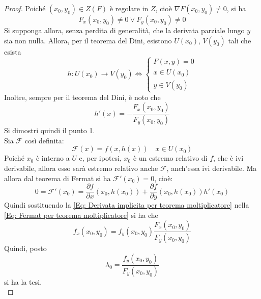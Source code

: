 \begin{proof}
    Poiché $(x_0, y_0) \in Z(F)$ è regolare in $Z$, cioè $\nabla F(x_0, y_0) \neq 0$, si ha 
    \begin{equation*}
        F_x(x_0, y_0) \neq 0 \lor F_y(x_0, y_0) \neq 0
    \end{equation*}
    Si supponga allora, senza perdita di generalità, che la derivata parziale lungo $y$ sia non nulla. Allora, per il teorema del Dini, esistono $U(x_0)$, $V(y_0)$ tali che esista
    \begin{equation*}
    h:U(x_0) \to V(y_0) \iff \begin{cases}
        F(x, y)=0\\
        x\in U(x_0)\\
        y \in V(y_0)
    \end{cases}
    \end{equation*}
    Inoltre, sempre per il teorema del Dini, è noto che
    \begin{equation} \label{Eq: Derivata implicita per teorema moltiplicatore}
        h'(x)=- \frac{F_x(x_0, y_0)}{F_y(x_0, y_0)} 
    \end{equation}
    Si dimostri quindi il punto 1.\\
    Sia $\mathcal{F}$ così definita:
    \begin{equation*}
        \mathcal{F}(x)=f(x, h(x)) \quad x \in U(x_0)
    \end{equation*}
     Poiché $x_0$ è interno a $U$ e, per ipotesi, $x_0$ è un estremo relativo di $f$, che è ivi derivabile, allora esso sarà estremo relativo anche $\mathcal{F}$, anch'essa ivi derivabile. Ma allora dal teorema di Fermat si ha $\mathcal{F}'(x_0)=0$, cioè:
    \begin{equation}  \label{Eq: Fermat per teorema moltiplicatore}    0=\mathcal{F}'(x_0)=\frac{\partial{f}}{\partial{x}}(x_0, h(x_0))+ \frac{\partial{f}}{\partial{y}}(x_0, h(x_0))h'(x_0)
    \end{equation}
    Quindi sostituendo la \eqref{Eq: Derivata implicita per teorema moltiplicatore} nella \eqref{Eq: Fermat per teorema moltiplicatore} si ha che
    \begin{equation*}
        f_x(x_0, y_0)={f_y(x_0, y_0)} \frac{F_x(x_0, y_0)}{F_y(x_0, y_0)}
    \end{equation*}
    Quindi, posto
    \begin{equation*}
        \lambda_0=\frac{f_y(x_0, y_0)}{F_y(x_0, y_0)}
    \end{equation*}
    si ha la tesi.\\

\end{proof}
